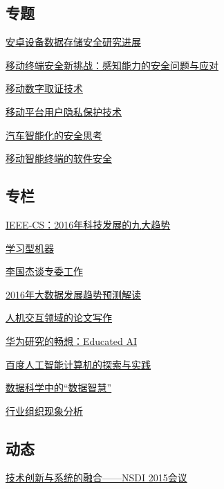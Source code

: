 \documentclass[a4paper]{article}
\begin{document}
\subsection{专题}
\href{http://history.ccf.org.cn/resources/1190201776262/2016/01/13/2.pdf}{安卓设备数据存储安全研究进展}

\href{http://history.ccf.org.cn/resources/1190201776262/2016/01/13/3.pdf}{移动终端安全新挑战：感知能力的安全问题与应对}

\href{http://history.ccf.org.cn/resources/1190201776262/2016/01/13/6.pdf}{移动数字取证技术}

\href{http://history.ccf.org.cn/resources/1190201776262/2016/01/13/5.pdf}{移动平台用户隐私保护技术}

\href{http://history.ccf.org.cn/resources/1190201776262/2016/01/13/4.pdf}{汽车智能化的安全思考}

\href{http://history.ccf.org.cn/resources/1190201776262/2016/01/22/导言.pdf}{移动智能终端的软件安全}

\subsection{专栏}
\href{http://history.ccf.org.cn/resources/1190201776262/2016/01/13/15.pdf}{IEEE-CS：2016年科技发展的九大趋势}

\href{http://history.ccf.org.cn/resources/1190201776262/2016/01/13/14.pdf}{学习型机器}

\href{http://history.ccf.org.cn/resources/1190201776262/2016/01/13/8.pdf}{李国杰谈专委工作}

\href{http://history.ccf.org.cn/resources/1190201776262/2016/01/13/7.pdf}{2016年大数据发展趋势预测解读}

\href{http://history.ccf.org.cn/resources/1190201776262/2016/01/13/12.pdf}{人机交互领域的论文写作}

\href{http://history.ccf.org.cn/resources/1190201776262/2016/01/13/13.pdf}{华为研究的畅想：Educated AI}

\href{http://history.ccf.org.cn/resources/1190201776262/2016/01/13/9.pdf}{百度人工智能计算机的探索与实践}

\href{http://history.ccf.org.cn/resources/1190201776262/2016/01/13/10.pdf}{数据科学中的“数据智慧”}

\href{http://history.ccf.org.cn/resources/1190201776262/2016/01/13/11.pdf}{行业组织现象分析}

\subsection{动态}
\href{http://history.ccf.org.cn/resources/1190201776262/2016/01/13/17.pdf}{技术创新与系统的融合——NSDI 2015会议}
\end{document}
